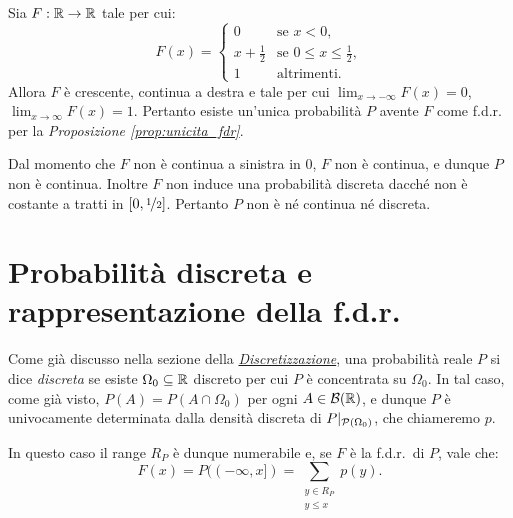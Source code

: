 \begin{multicols*}{2}
\begin{center}
\end{center}

\begin{example}
    Sia $F : \mathbb{R} \to \mathbb{R}$ tale per cui:
    \[
        F(x) = \begin{cases}
            0 & \text{se } x < 0, \\
            x + \frac{1}{2} & \text{se } 0 \leq x \leq \frac{1}{2}, \\
            1 & \text{altrimenti}.
        \end{cases}
    \]
    Allora $F$ è crescente, continua a destra e tale per cui
    $\lim_{x \to -\infty} F(x) = 0$, $\lim_{x \to \infty} F(x) = 1$.
    Pertanto esiste un'unica probabilità $P$ avente $F$ come f.d.r. per la
    \textit{Proposizione \ref{prop:unicita_fdr}}. \smallskip


    Dal momento che $F$ non è continua a sinistra in $0$, $F$ non è continua, e dunque
    $P$ non è continua. Inoltre $F$ non induce una probabilità discreta dacché
    non è costante a tratti in $[0, \nicefrac{1}{2}]$. Pertanto $P$ non è né
    continua né discreta.
\end{example}

\section{Probabilità discreta e rappresentazione della f.d.r.}

Come già discusso nella sezione della \textit{\hyperref[sec:discretizzazione]{Discretizzazione}},
una probabilità reale $P$ si dice \textit{discreta} se esiste $\Omega_0 \subseteq \mathbb{R}$
discreto per cui $P$ è concentrata su $\Omega_0$. In tal caso, come già visto,
$P(A) = P(A \cap \Omega_0)$ per ogni $A \in \mathcal{B}(\mathbb{R})$, e dunque $P$ è univocamente determinata
dalla densità discreta di $P\arrowvert_{\mathcal{P}(\Omega_0)}$, che chiameremo $p$. \smallskip


In questo caso il range $R_P$ è dunque numerabile e, se $F$ è la f.d.r.~di $P$, vale che:
\[
    F(x) = P((-\infty, x]) = \sum_{\substack{y \in R_P \\ y \leq x}} p(y).
\]


\end{multicols*}
